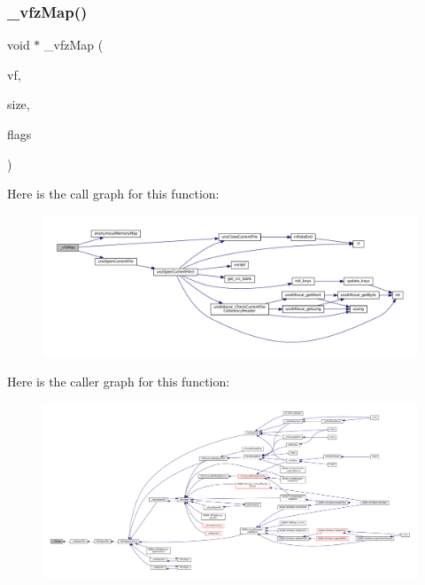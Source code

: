 \subsubsection{\texorpdfstring{\+\_\+vfz\+Map()}{\_vfzMap()}}
{\footnotesize\ttfamily void $\ast$ \+\_\+vfz\+Map (\begin{DoxyParamCaption}\item[{struct V\+File $\ast$}]{vf,  }\item[{size\+\_\+t}]{size,  }\item[{\mbox{\hyperlink{ioapi_8h_a787fa3cf048117ba7123753c1e74fcd6}{int}}}]{flags }\end{DoxyParamCaption})\hspace{0.3cm}{\ttfamily [static]}}

Here is the call graph for this function\+:
\nopagebreak
\begin{figure}[H]
\begin{center}
\leavevmode
\includegraphics[width=350pt]{vfs-zip_8c_a2569d7414fd035ae883a93e401f2deee_cgraph}
\end{center}
\end{figure}
Here is the caller graph for this function\+:
\nopagebreak
\begin{figure}[H]
\begin{center}
\leavevmode
\includegraphics[width=350pt]{vfs-zip_8c_a2569d7414fd035ae883a93e401f2deee_icgraph}
\end{center}
\end{figure}
\mbox{\label{vfs-zip_8c_a593e9a250e3d7aa9c3b94a1f7b9a8cca}} 
